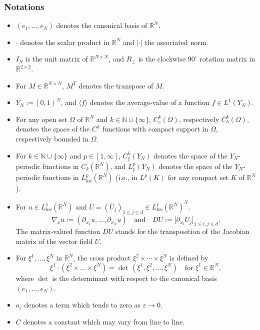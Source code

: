 \documentclass[11pt]{article}
\newcommand{\ie}{i.e.,\xspace}
\newcommand{\skpt}{\smallskip}
\newcommand{\loc}{\mathrm{loc}}
\let \Om \Omega
\def \NN {\mathbb N}
\def \RR {\mathbb R}
\theoremstyle{plain}
\theoremstyle{definition}
\numberwithin{equation}{section}
\begin{document}
\skpt
\subsubsection*{Notations}
\begin{itemize}
\item $\left(e_1,\dots,e_N\right)$ denotes the canonical basis of $\RR^N$.
\item $\cdot$ denotes the scalar product in $\RR^N$ and $|\cdot|$ the associated norm.
\item $I_N$ is the unit matrix of $\RR^{N\times N}$, and $R_\perp$ is the clockwise $90^\circ$ rotation matrix in $\RR^{2\times 2}$.
\item For $M\in\RR^{N\times N}$, $M^T$ denotes the transpose of $M$.
\item $Y_N:=\left[0,1\right)^N$, and $\langle f\rangle$ denotes the average-value of a function $f\in L^1(Y_N)$.

\item For any open set $\Om$ of $\RR^N$ and $k\in\NN\cup\{\infty\}$, $C^k_c(\Om)$, respectively $C^k_b(\Om)$, denotes the space of the $C^k$ functions with compact support in $\Om$, respectively bounded in $\Om$.
\item For $k\in\NN\cup\{\infty\}$ and $p\in[1,\infty]$, $C^k_\sharp(Y_N)$ denotes the space of the $Y_N$-periodic functions in $C_k(\RR^N)$, and $L^p_\sharp(Y_N)$ denotes the space of the $Y_N$-periodic functions in $L^p_\loc(\RR^N)$ (\ie in $L^p(K)$ for any compact set $K$ of $\RR^N$).
\item For $u\in L^1_\loc(\RR^N)$ and $U=(U_j)_{1\leq j\leq d}\in L^1_\loc(\RR^N)^N$.
\[
\nabla_x u:=\left(\partial_{x_1}u,\dots,\partial_{x_N}u\right)\quad\mbox{and}\quad DU:=\big[\partial_{x_i}U_j\big]_{1\leq i,j\leq d}.
\]
The matrix-valued function $DU$ stands for the transposition of the Jacobian matrix of the vector field $U$.
\item For $\xi^1,\dots,\xi^N$ in $\RR^N$, the cross product $\xi^2\times\cdots\times \xi^N$ is defined by
\begin{equation}\label{crpr}
\xi^1\cdot(\xi^2\times\dots\times \xi^N)=\det\,(\xi^1,\xi^2,\dots,\xi^N)\quad\mbox{for }\xi^1\in\RR^N,
\end{equation}
where $\det$ is the determinant with respect to the canonical basis $(e_1,\dots,e_N)$.
\item $o_\varepsilon$ denotes a term which tends to zero as $\varepsilon\to 0$.
\item $C$ denotes a constant which may vary from line to line.
\end{itemize}
\end{document}
